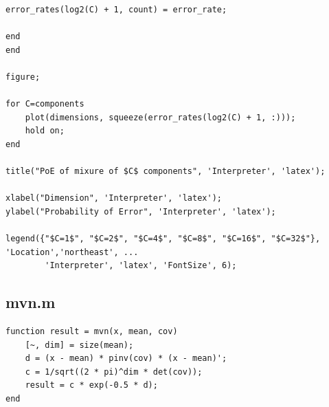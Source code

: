 \documentclass{article}
\begin{document}
\begin{lstlisting}
error_rates(log2(C) + 1, count) = error_rate;

end
end

figure;

for C=components
    plot(dimensions, squeeze(error_rates(log2(C) + 1, :)));
    hold on;
end

title("PoE of mixure of $C$ components", 'Interpreter', 'latex');

xlabel("Dimension", 'Interpreter', 'latex');
ylabel("Probability of Error", 'Interpreter', 'latex');

legend({"$C=1$", "$C=2$", "$C=4$", "$C=8$", "$C=16$", "$C=32$"}, 'Location','northeast', ...
        'Interpreter', 'latex', 'FontSize', 6);
\end{lstlisting}

\subsection*{mvn.m}

\begin{lstlisting}
function result = mvn(x, mean, cov)
    [~, dim] = size(mean);
    d = (x - mean) * pinv(cov) * (x - mean)';
    c = 1/sqrt((2 * pi)^dim * det(cov));
    result = c * exp(-0.5 * d);
end
\end{lstlisting}
\end{document}
